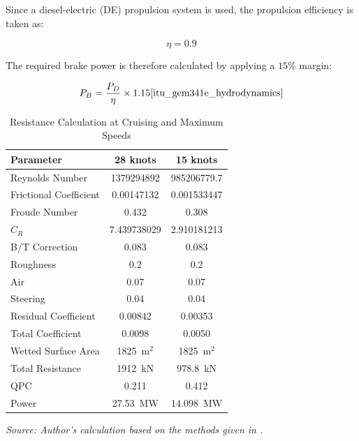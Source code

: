 \documentclass[12pt,a4paper,twoside]{report}
\begin{document}
\vspace{\baselineskip} \par \noindent Since a diesel-electric (DE) propulsion system is used, the propulsion
efficiency is taken as:

\[
\eta=0.9
\]

\vspace{\baselineskip} \par \noindent The required brake power is therefore calculated by applying a $15\%$
margin:

\begin{equation}
P_B=\frac{P_D}{\eta}\times1.15
\cite{itu_gem341e_hydrodynamics}
\end{equation}


\begin{table}[H]
    \centering
    \caption{Resistance Calculation at Cruising and Maximum Speeds}
    \label{tab:resistance_calculation}

    \normalsize
    \setlength{\tabcolsep}{12pt}
    \renewcommand{\arraystretch}{1.25}

    \begin{tabular}{lcc}
        \toprule
        \textbf{Parameter} & \textbf{28 knots} & \textbf{15 knots} \\
        \midrule
        Reynolds Number        & 1379294892 & 985206779.7 \\
        Frictional Coefficient & 0.00147132 & 0.001533447 \\
    
        Froude Number          & 0.432      & 0.308 \\
        $C_R$ & 7.439738029 & 2.910181213 \\

        B/T Correction         & 0.083      & 0.083 \\
        Roughness              & 0.2        & 0.2 \\
        Air                    & 0.07       & 0.07 \\
        Steering               & 0.04       & 0.04 \\
        Residual Coefficient   & 0.00842    & 0.00353 \\
        
        Total Coefficient      & 0.0098     & 0.0050 \\
        Wetted Surface Area    & 1825~m$^2$ & 1825~m$^2$ \\
        Total Resistance       & 1912~kN & 978.8~kN \\
        QPC                    & 0.211      & 0.412 \\
        Power                  & 27.53~MW   & 14.098~MW \\
        \bottomrule
    \end{tabular}

    \vspace{3mm}

    \footnotesize
    \textit{Source: Author's calculation based on the methods given in
    \cite{itu_gem341e_hydrodynamics}.}
\end{table}
\end{document}
